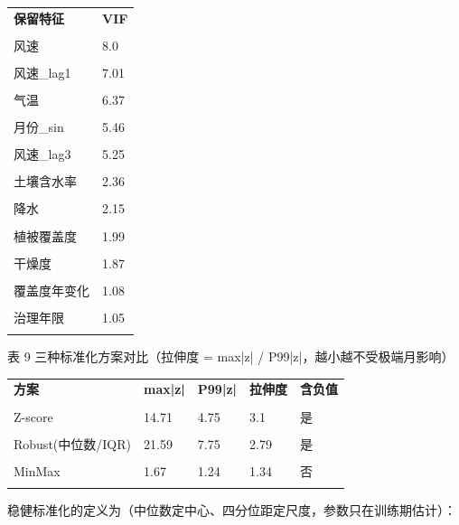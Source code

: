 \documentclass[11pt,a4paper]{ctexart}
\begin{document}
\begin{table}[H]\centering\small\setlength{\parskip}{2pt}
\begin{tabularx}{\textwidth}{|X|X|}
\toprule
\textbf{保留特征} & \textbf{VIF} \\\\
\midrule
风速 & 8.0 \\\\
风速\_lag1 & 7.01 \\\\
气温 & 6.37 \\\\
月份\_sin & 5.46 \\\\
风速\_lag3 & 5.25 \\\\
土壤含水率 & 2.36 \\\\
降水 & 2.15 \\\\
植被覆盖度 & 1.99 \\\\
干燥度 & 1.87 \\\\
覆盖度年变化 & 1.08 \\\\
治理年限 & 1.05 \\\\
\bottomrule
\end{tabularx}
\end{table}
表 9  三种标准化方案对比（拉伸度 = max|z| / P99|z|，越小越不受极端月影响）


\begin{table}[H]\centering\small\setlength{\parskip}{2pt}
\begin{tabularx}{\textwidth}{|X|X|X|X|X|}
\toprule
\textbf{方案} & \textbf{max|z|} & \textbf{P99|z|} & \textbf{拉伸度} & \textbf{含负值} \\\\
\midrule
Z-score & 14.71 & 4.75 & 3.1 & 是 \\\\
Robust(中位数/IQR) & 21.59 & 7.75 & 2.79 & 是 \\\\
MinMax & 1.67 & 1.24 & 1.34 & 否 \\\\
\bottomrule
\end{tabularx}
\end{table}
稳健标准化的定义为（中位数定中心、四分位距定尺度，参数只在训练期估计）：
\end{document}
